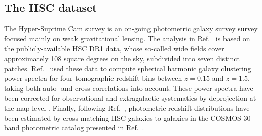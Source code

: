 \documentclass[a4paper,11pt]{article}
\begin{document}
\subsection{The HSC dataset}
The Hyper-Suprime Cam survey is an on-going photometric galaxy survey survey focused mainly on weak gravitational lensing. The analysis in Ref.~\cite{1912.08209} is based on the publicly-available HSC DR1 data, whose so-called wide fields cover approximately 108 square degrees on the sky, subdivided into seven distinct patches. Ref.~\cite{1912.08209} used these data to compute spherical harmonic galaxy clustering power spectra for four tomographic redshift bins between $z=0.15$ and $z=1.5$, taking both auto- and cross-correlations into account. These power spectra have been corrected for observational and extragalactic systematics by deprojection at the map-level \cite{2019MNRAS.484.4127A}. Finally, following Ref.~\cite{2019PASJ...71...43H}, photometric redshift distributions have been estimated by cross-matching HSC galaxies to galaxies in the COSMOS 30-band photometric catalog presented in Ref.~\cite{2016ApJS..224...24L}.
\end{document}

